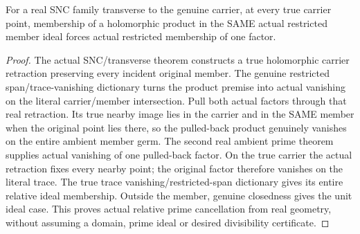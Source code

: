 \begin{theorem}
\label{hir:sharp-actual-transverse-member-relative-prime-cancellation}
\leanok
For a real SNC family transverse to the genuine carrier, at every true
carrier point, membership of a holomorphic product in the SAME actual
restricted member ideal forces actual restricted membership of one factor.
\end{theorem}
\begin{proof}
The actual SNC/transverse theorem constructs a true holomorphic carrier
retraction preserving every incident original member. The genuine restricted
span/trace-vanishing dictionary turns the product premise into actual
vanishing on the literal carrier/member intersection. Pull both actual
factors through that real retraction. Its true nearby image lies in the
carrier and in the SAME member when the original point lies there, so the
pulled-back product genuinely vanishes on the entire ambient member germ.
The second real ambient prime theorem supplies actual vanishing of one
pulled-back factor. On the true carrier the actual retraction fixes every
nearby point; the original factor therefore vanishes on the literal trace.
The true trace vanishing/restricted-span dictionary gives its entire relative
ideal membership. Outside the member, genuine closedness gives the unit
ideal case. This proves actual relative prime cancellation from real geometry,
without assuming a domain, prime ideal or desired divisibility certificate.
\end{proof}

